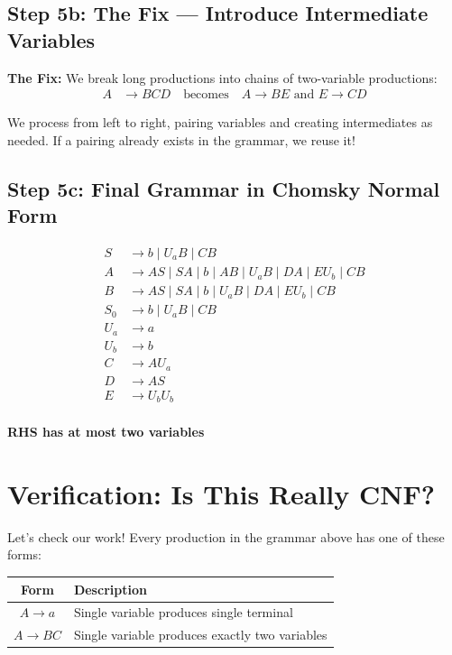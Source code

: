 \documentclass{article}
\begin{document}
\subsection{Step 5b: The Fix — Introduce Intermediate Variables}

\noindent\textbf{The Fix:} We break long productions into chains of two-variable productions:
\begin{align*}
    A &\to BCD \quad \text{becomes} \quad A \to BE \text{ and } E \to CD
\end{align*}

We process from left to right, pairing variables and creating intermediates as needed. If a pairing already exists in the grammar, we reuse it!

\subsection{Step 5c: Final Grammar in Chomsky Normal Form}

\begin{align*}
    S &\to b \mid U_aB \mid CB\\
    A &\to AS \mid SA \mid b \mid AB \mid U_aB \mid DA \mid EU_b \mid CB\\
    B &\to AS \mid SA \mid b \mid U_aB \mid DA \mid EU_b \mid CB\\
    S_0 &\to b \mid U_aB \mid CB\\
    U_{a} &\to a\\
    U_{b} &\to b\\
    C &\to AU_a\\
    D &\to AS\\
    E &\to U_bU_b\\
    \end{align*}

\vspace{0.2cm}
\noindent\textcolor{green!60!black}{\textbf{ RHS has at most two variables}}

\section*{Verification: Is This Really CNF?}

Let's check our work! Every production in the grammar above has one of these forms:

\begin{center}
\begin{tabular}{|c|l|}
\hline
\textbf{Form} & \textbf{Description} \\
\hline
$A \to a$ & Single variable produces single terminal \\
$A \to BC$ & Single variable produces exactly two variables \\
\hline
\end{tabular}
\end{center}
\end{document}
